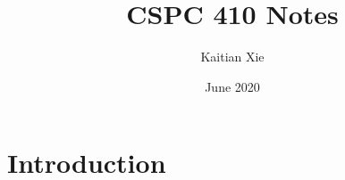 \documentclass{article}
\title{CSPC 410 Notes}
\author{Kaitian Xie}
\date{June 2020}
\begin{document}
\maketitle

\section{Introduction}
\end{document}
